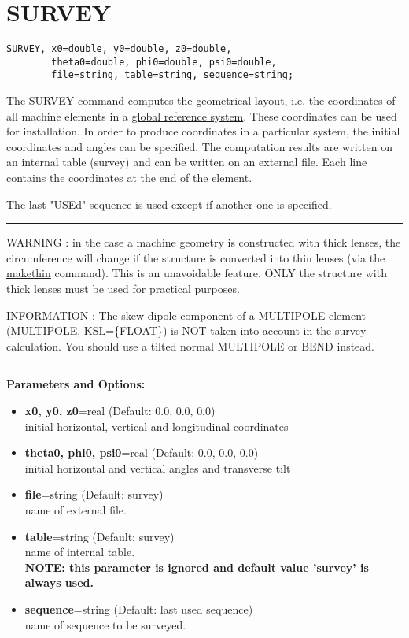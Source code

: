  
\chapter{SURVEY}

\begin{verbatim}
SURVEY, x0=double, y0=double, z0=double, 
        theta0=double, phi0=double, psi0=double,
        file=string, table=string, sequence=string;
\end{verbatim}

The SURVEY command computes the geometrical layout, i.e. the coordinates
of all machine elements in a 
\href{../Introduction/conventions.html}{global reference system}. These
coordinates can be used for installation. In order to produce
coordinates in a particular system, the initial coordinates and angles
can be specified. The computation results are written on an internal
table (survey) and can be written on an external file. Each line
contains the coordinates at the end of the element. 

The last "USEd" sequence is used except if another one is specified.
\\
\hrule
WARNING : in the case a machine geometry is constructed with thick
lenses, the circumference will change if the structure is converted into
thin lenses (via the \href{../makethin/makethin.html}{makethin}
command). This is an unavoidable feature. ONLY the structure with thick
lenses must be used for practical purposes.

INFORMATION : The skew dipole component of a MULTIPOLE element
(MULTIPOLE, KSL=\{FLOAT\}) is NOT taken into account in the survey
calculation. You should use a tilted normal MULTIPOLE or BEND instead.
\\
\hrule

{\bf Parameters and Options:}
\begin{itemize}
\item {\bf x0, y0, z0}=real (Default: 0.0, 0.0, 0.0)\\
initial horizontal, vertical and longitudinal coordinates 
\item {\bf theta0, phi0, psi0}=real (Default: 0.0, 0.0, 0.0)\\
initial horizontal and vertical angles  and transverse tilt
\item {\bf file}=string (Default: survey)\\
name of external file.
\item {\bf table}=string (Default: survey)\\
name of internal table. \\
{\bf NOTE: this parameter is ignored and default value 'survey' is always used.}
\item {\bf sequence}=string (Default: last used sequence)\\
name of sequence to be surveyed.
\end{itemize}

